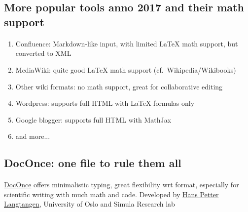 \documentclass[%
oneside,                 %
final,                   %
10pt]{article}
\begin{document}
\noindent




\subsection{More popular tools anno 2017 and their math support}

\paragraph{}
\begin{enumerate}
\item Confluence: Markdown-like input, with limited {\LaTeX} math support, but converted to XML

\item MediaWiki: quite good {\LaTeX} math support (cf.~Wikipedia/Wikibooks)

\item Other wiki formats: no math support, great for collaborative editing

\item Wordpress: supports full HTML with {\LaTeX} formulas only

\item Google blogger: supports full HTML with MathJax

\item and more...
\end{enumerate}

\noindent






\subsection{DocOnce: one file to rule them all}

\paragraph{}

\href{{http://hplgit.github.io/doconce/doc/web/index.html}}{DocOnce} offers minimalistic typing, great flexibility wrt format, especially for scientific writing with much math and code. Developed by \href{{http://hplgit.github.io/homepage/index.html}}{Hans Petter Langtangen}, University of Oslo and Simula Research lab
\end{document}
